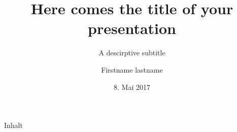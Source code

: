 \title[A short title]{Here comes the title of your presentation}
\subtitle{A descirptive subtitle}
\author{Firstname lastname}
\date{8. Mai 2017}

\begin{frame}
	\titlepage
\end{frame}

\begin{frame}[c]{Inhalt}
	\tableofcontents
\end{frame}
